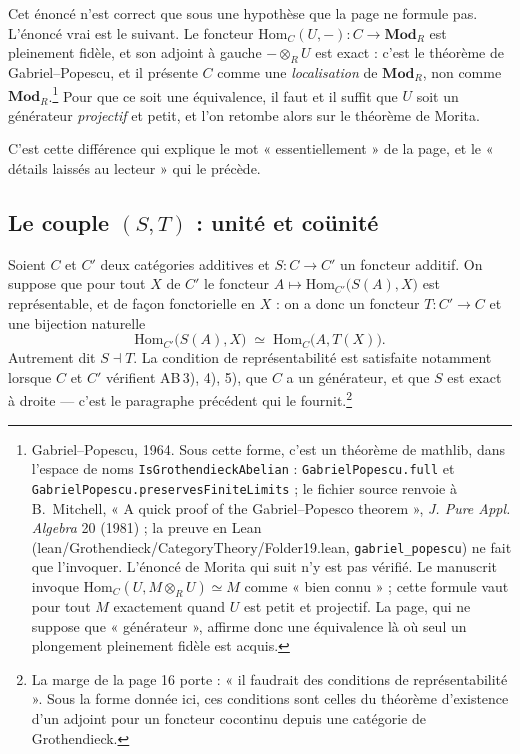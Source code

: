 \documentclass[11pt,a4paper]{article}
\begin{document}
Cet énoncé n'est correct que sous une hypothèse que la page ne formule pas.
L'énoncé vrai est le suivant. Le foncteur $\mathrm{Hom}_{C}(U, -) : C \to
\mathbf{Mod}_{R}$ est pleinement fidèle, et son adjoint à gauche $- \otimes_{R}
U$ est exact : c'est le théorème de Gabriel--Popescu, et il présente $C$ comme
une \emph{localisation} de $\mathbf{Mod}_{R}$, non comme
$\mathbf{Mod}_{R}$.\footnote{Gabriel--Popescu, 1964. Sous cette forme, c'est
un théorème de mathlib, dans l'espace de noms
\texttt{IsGrothendieckAbelian} : \texttt{GabrielPopescu.full} et
\texttt{GabrielPopescu.preservesFiniteLimits} ; le
fichier source renvoie à B.~Mitchell, « A quick proof of the Gabriel--Popesco
theorem », \emph{J. Pure Appl. Algebra} 20 (1981) ; la preuve en Lean
(lean/Grothendieck/CategoryTheory/Folder19.lean, \texttt{gabriel\_popescu}) ne fait que
l'invoquer. L'énoncé de Morita qui suit n'y est pas vérifié. Le manuscrit invoque
$\mathrm{Hom}_{C}(U, M \otimes_{R} U) \simeq M$ comme « bien connu » ; cette
formule vaut pour tout $M$ exactement quand $U$ est petit et projectif. La
page, qui ne suppose que « générateur », affirme donc une équivalence là où
seul un plongement pleinement fidèle est acquis.} Pour que ce soit une
équivalence, il faut et il suffit que $U$ soit un générateur \emph{projectif}
et petit, et l'on retombe alors sur le théorème de Morita.

C'est cette différence qui explique le mot « essentiellement » de la page, et
le « détails laissés au lecteur » qui le précède.

\subsection*{Le couple $(S,T)$ : unité et coünité}

Soient $C$ et $C'$ deux catégories additives et $S : C \to C'$ un foncteur
additif. On suppose que pour tout $X$ de $C'$ le foncteur
$A \mapsto \mathrm{Hom}_{C'}\bigl( S(A), X \bigr)$ est représentable, et de
façon fonctorielle en $X$ : on a donc un foncteur $T : C' \to C$ et une
bijection naturelle
\[
  \mathrm{Hom}_{C'}\bigl( S(A), X \bigr) \;\simeq\;
  \mathrm{Hom}_{C}\bigl( A, T(X) \bigr) .
\]
Autrement dit $S \dashv T$. La condition de représentabilité est satisfaite
notamment lorsque $C$ et $C'$ vérifient AB\,3), 4), 5), que $C$ a un
générateur, et que $S$ est exact à droite — c'est le paragraphe précédent qui
le fournit.\footnote{La marge de la page 16 porte : « il faudrait des
conditions de représentabilité ». Sous la forme donnée ici, ces conditions sont
celles du théorème d'existence d'un adjoint pour un foncteur cocontinu depuis
une catégorie de Grothendieck.}
\end{document}
